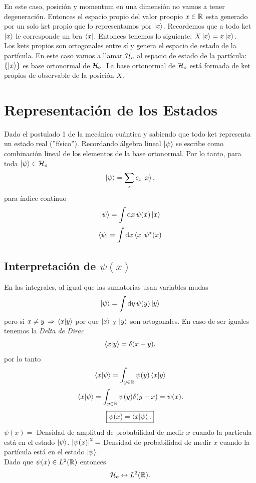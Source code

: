 En este caso, posición y momentum en una dimensión no vamos a tener degeneración. Entonces el espacio propio del valor proopio $x\in \mathbb{R}$ esta generado por un solo ket propio que lo representamos por $\ket{x}$. Recordemos que a todo ket $\ket{x}$ le corresponde un bra $\bra{x}$. Entonces tenemos lo siguiente: $X\ket{x} = x\ket{x}$.\\

Los kets propios son ortogonales entre sí y genera el espacio de estado de la partícula. En este caso vamos a llamar $\mathcal{H} _o$ al espacio de estado de la partícula: $\{ \ket{x} \}$ es base ortonormal de $\mathcal{H} _o$. La base ortonormal de $\mathcal{H} _o$ está formada de ket propios de observable de la posición $X$.


\section{Representación de los Estados}
Dado el postulado 1 de la mecánica cuántica y sabiendo que todo ket representa un estado real (''físico''). Recordando álgebra lineal $\ket{\psi}$ se escribe como combinación lineal de los elementos de la base ortonormal. Por lo tanto, para toda $\ket{\psi} \in \mathcal{H} _o$
    $$ \ket{\psi} = \sum _x c_x \ket{x}, $$
para índice continuo
    $$ \ket{\psi} = \int \dd{x} \psi (x) \ket{x} $$
    $$ \bra{\psi} = \int \dd{x} \bra{x} \psi ^* (x) $$
    
\subsection{Interpretación de $\psi (x)$}
En las integrales, al igual que las sumatorias usan variables mudas
    $$ \ket{\psi} = \int \dd{y} \psi (y) \ket{y} $$
pero si $x\neq y \, \Rightarrow \, \braket{x}{y}$ por que $\ket{x}$ y $\ket{y}$ son ortogonales. En caso de ser iguales tenemos la \textit{Delta de Dirac}
    $$ \braket{x}{y} = \delta (x - y). $$
por lo tanto
    $$ \braket{x}{\psi} = \int _{y\in \mathbb{R}} \psi (y) \braket{x}{y} $$
    $$ \braket{x}{\psi} = \int _{y\in \mathbb{R}} \psi (y) \delta (y - x) = \psi (x). $$
    $$ \boxed{ \psi (x) = \braket{x}{\psi}. } $$
$\psi (x) = $ Densidad de amplitud de probabilidad de medir $x$ cuando la partícula está en el estado $\ket{\psi}$. $\abs{\psi (x)}^2 = $ Densidad de probabilidad de medir $x$ cuando la partícula está en el estado $\ket{\psi}$. \\

Dado que $\psi (x) \in L^2 (\mathbb{R})$ entonces
    $$ \mathcal{H} _o \leftrightarrow L^2 (\mathbb{R}). $$

